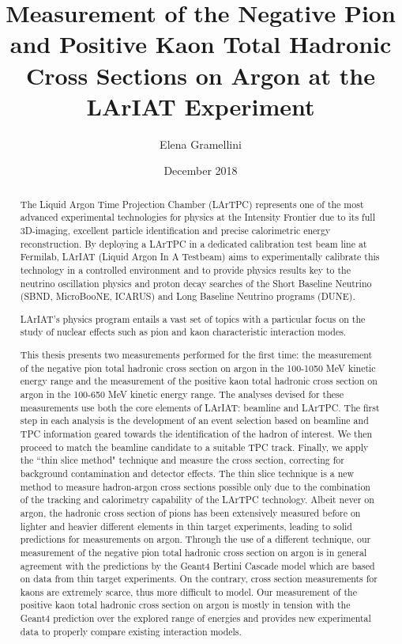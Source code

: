 \documentclass[letterpaper,12pt]{yalephd}
\begin{document}
\title{Measurement of the Negative Pion and Positive Kaon Total Hadronic Cross Sections on Argon at the LArIAT Experiment}
\author{Elena Gramellini}
\date{December 2018} %

\frontmatter

\begin{abstract}

The Liquid Argon Time Projection Chamber (LArTPC) represents one of the
most advanced experimental technologies for physics at the Intensity
Frontier due to its full 3D-imaging, excellent particle identification
and precise calorimetric energy reconstruction. By deploying a LArTPC in
a dedicated calibration test beam line at Fermilab, LArIAT (Liquid
Argon In A Testbeam) aims to experimentally calibrate this technology
in a controlled environment and to provide physics results key to the
neutrino oscillation physics and proton decay searches of the Short
Baseline Neutrino (SBND, MicroBooNE, ICARUS) and Long Baseline Neutrino programs (DUNE).

LArIAT's physics program entails a vast set of topics with a
particular focus on the study of nuclear effects such as pion and
kaon characteristic interaction modes. 

This thesis presents two measurements performed for the first time: the measurement of the negative pion total hadronic cross section on argon in the 100-1050 MeV kinetic energy range and the measurement of the positive kaon total hadronic cross section on argon in the 100-650 MeV kinetic energy range. The analyses devised for these measurements use both the core elements of LArIAT: beamline and LArTPC. The first step in each analysis is the development of an event selection based on  beamline and TPC information geared towards the identification of the hadron of interest. We then proceed to match the beamline candidate to a suitable TPC track. Finally,  we apply the ``thin slice method" technique and measure the cross section, correcting for background contamination and detector effects. The thin slice technique is a new method to measure hadron-argon cross sections possible only due to the combination of the tracking and calorimetry capability of the LArTPC technology. 
Albeit never on argon, the hadronic cross section of pions has been extensively measured before on lighter and heavier different elements in thin target experiments, leading to solid predictions for measurements on argon. Through the use of a different technique, our measurement of the negative pion total hadronic cross section on argon is in general agreement with the predictions by the Geant4 Bertini Cascade model which are based on data from thin target experiments. On the contrary, cross section measurements for kaons are extremely scarce, thus more difficult to model. Our measurement of the  positive kaon total hadronic cross section on argon is mostly in tension with the Geant4 prediction over the explored range of energies and provides new experimental data to properly compare existing interaction models.


\end{abstract}
\end{document}
